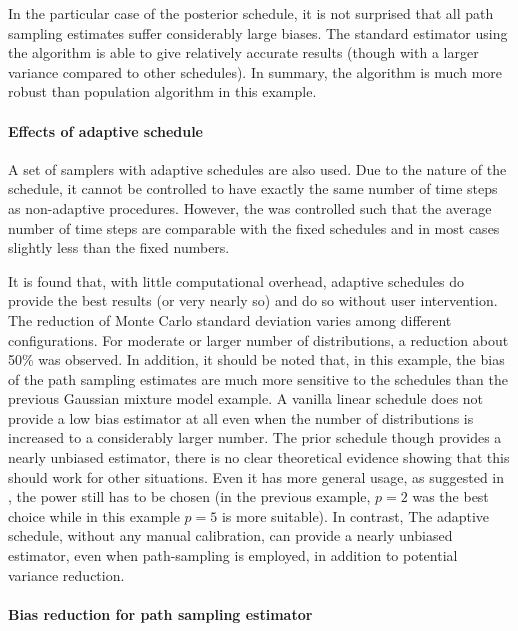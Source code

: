 In the particular case of the posterior schedule, it is not surprised that
all path sampling estimates suffer considerably large biases. The standard
estimator using the \smc[2] algorithm is able to give relatively accurate
results (though with a larger variance compared to other schedules). In
summary, the \smc algorithm is much more robust than population \mcmc
algorithm in this example.

\afterpage{\clearpage}
\afterpage{\clearpage}

\paragraph{Effects of adaptive schedule}

A set of samplers with adaptive schedules are also used. Due to the nature of
the schedule, it cannot be controlled to have exactly the same number of time
steps as non-adaptive procedures. However, the \cess was controlled such that
the average number of time steps are comparable with the fixed schedules and
in most cases slightly less than the fixed numbers.

It is found that, with little computational overhead, adaptive schedules do
provide the best results (or very nearly so) and do so without user
intervention. The reduction of Monte Carlo standard deviation varies among
different configurations. For moderate or larger number of distributions, a
reduction about 50\% was observed. In addition, it should be noted that, in
this example, the bias of the path sampling estimates are much more sensitive
to the schedules than the previous Gaussian mixture model example. A vanilla
linear schedule does not provide a low bias estimator at all even when the
number of distributions is increased to a considerably larger number. The
prior schedule though provides a nearly unbiased estimator, there is no clear
theoretical evidence showing that this should work for other situations. Even
it has more general usage, as suggested in \cite{Calderhead:2009bd}, the power
still has to be chosen (in the previous \gmm example, $p = 2$ was the best
choice while in this \pet example $p = 5$ is more suitable). In contrast, The
adaptive schedule, without any manual calibration, can provide a nearly
unbiased estimator, even when path-sampling is employed, in addition to
potential variance reduction.

\paragraph{Bias reduction for path sampling estimator}

